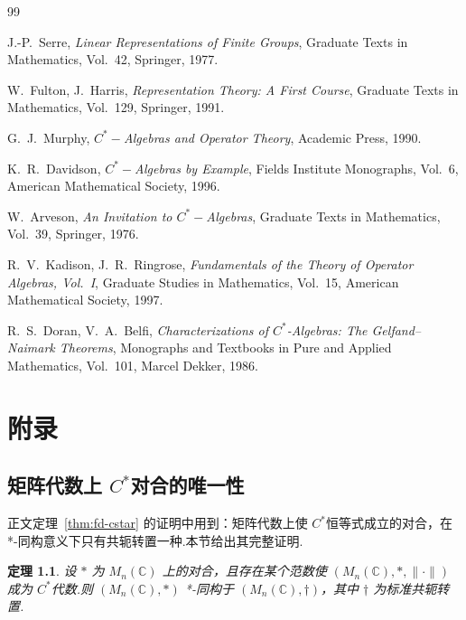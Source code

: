 \documentclass[math-font=lm, text-font=lm, math-style=TeX]{sjtureport}
\newtheorem{theorem}{定理}[chapter]
\theoremstyle{plain}
\theoremstyle{plain}
\begin{document}
\begin{thebibliography}{99}

J.-P.~Serre,
\emph{Linear Representations of Finite Groups},
Graduate Texts in Mathematics, Vol.~42, Springer, 1977.

W.~Fulton, J.~Harris,
\emph{Representation Theory: A First Course},
Graduate Texts in Mathematics, Vol.~129, Springer, 1991.

G.~J.~Murphy,
\emph{$C^*-\!$Algebras and Operator Theory},
Academic Press, 1990.

K.~R.~Davidson,
\emph{$C^*-\!$Algebras by Example},
Fields Institute Monographs, Vol.~6, American Mathematical Society, 1996.

W.~Arveson,
\emph{An Invitation to $C^*-\!$Algebras},
Graduate Texts in Mathematics, Vol.~39, Springer, 1976.

R.~V.~Kadison, J.~R.~Ringrose,
\emph{Fundamentals of the Theory of Operator Algebras, Vol.~I},
Graduate Studies in Mathematics, Vol.~15, American Mathematical Society, 1997.

R.~S.~Doran, V.~A.~Belfi,
\emph{Characterizations of $C^*$-Algebras: The Gelfand--Naimark Theorems},
Monographs and Textbooks in Pure and Applied Mathematics, Vol.~101, Marcel Dekker, 1986.

\end{thebibliography}

\appendix
\chapter{附录}




\section{矩阵代数上 $C^*$对合的唯一性}\label{app:involution-uniqueness}

正文定理~\ref{thm:fd-cstar} 的证明中用到：矩阵代数上使 $C^*$恒等式成立的对合，在 *-同构意义下只有共轭转置一种.本节给出其完整证明.

\begin{theorem}\label{thm:involution-unique}
设 $*$ 为 $M_n(\mathbb{C})$ 上的对合，且存在某个范数使 $(M_n(\mathbb{C}), *, \|\cdot\|)$ 成为 $C^*$代数.则 $(M_n(\mathbb{C}), *)$ *-同构于 $(M_n(\mathbb{C}), \dagger)$，其中 $\dagger$ 为标准共轭转置.
\end{theorem}
\end{document}

